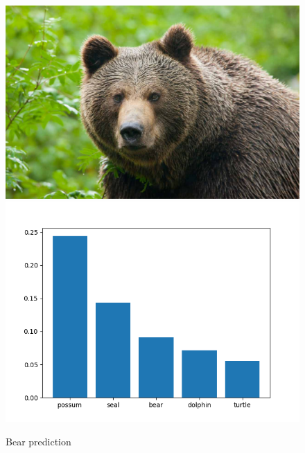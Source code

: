 \documentclass[12pt,spanish]{article}
\begin{document}
\begin{figure}[H]
\centering
\includegraphics[scale=0.1]{bear.jpg}
\includegraphics[scale=0.75]{bear_prediction.png}
\caption{Bear prediction}
\end{figure}
\end{document}
